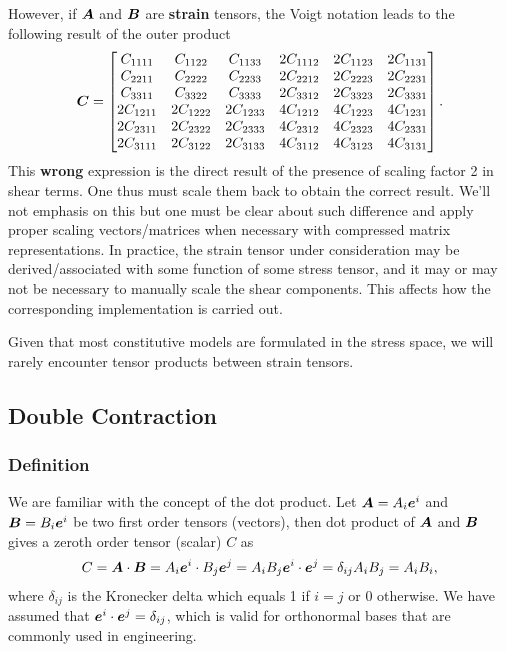 However, if $\bm{A}$ and $\bm{B}$ are \textbf{strain} tensors, the Voigt notation leads to the following result of the outer product
\begin{gather}
\bm{C}=\begin{bmatrix}
C_{1111}&C_{1122}&C_{1133}&2C_{1112}&2C_{1123}&2C_{1131}\\
C_{2211}&C_{2222}&C_{2233}&2C_{2212}&2C_{2223}&2C_{2231}\\
C_{3311}&C_{3322}&C_{3333}&2C_{3312}&2C_{3323}&2C_{3331}\\
2C_{1211}&2C_{1222}&2C_{1233}&4C_{1212}&4C_{1223}&4C_{1231}\\
2C_{2311}&2C_{2322}&2C_{2333}&4C_{2312}&4C_{2323}&4C_{2331}\\
2C_{3111}&2C_{3122}&2C_{3133}&4C_{3112}&4C_{3123}&4C_{3131}
\end{bmatrix}.
\end{gather}
This \textbf{wrong} expression is the direct result of the presence of scaling factor \num{2} in shear terms.
One thus must scale them back to obtain the correct result.
We'll not emphasis on this but one must be clear about such difference and apply proper scaling vectors/matrices when necessary with compressed matrix representations.
In practice, the strain tensor under consideration may be derived/associated with some function of some stress tensor, and it may or may not be necessary to manually scale the shear components.
This affects how the corresponding implementation is carried out.

Given that most constitutive models are formulated in the stress space, we will rarely encounter tensor products between strain tensors.
\subsection{Double Contraction}
\subsubsection{Definition}
We are familiar with the concept of the dot product. Let $\bm{A}=A_i\bm{e}^i$ and $\bm{B}=B_i\bm{e}^i$ be two first order tensors (vectors), then dot product of $\bm{A}$ and $\bm{B}$ gives a zeroth order tensor (scalar) $C$ as
\begin{gather}
C=\bm{A}\cdot\bm{B}=A_i\bm{e}^i\cdot{}B_j\bm{e}^j=A_iB_j\bm{e}^i\cdot\bm{e}^j=\delta_{ij}A_iB_j=A_iB_i,
\end{gather}
where $\delta_{ij}$ is the Kronecker delta which equals \num{1} if $i=j$ or \num{0} otherwise.
We have assumed that $\bm{e}^i\cdot\bm{e}^j=\delta_{ij}$, which is valid for orthonormal bases that are commonly used in engineering.

